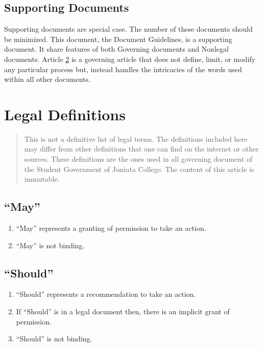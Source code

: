 \documentclass[12pt, letterpaper]{report}
\begin{document}
\begin{linenumbers}
        \section{Supporting Documents}
        Supporting documents are special case. The number of these documents should be minimized. This document, the Document Guidelines, is a supporting document. It share features of both Governing documents and Nonlegal documents. Article \ref{DDG-LegalDef} is a governing article that does not define, limit, or modify any particular process but, instead handles the intricacies of the words used within all other documents. 
	\chapter{Legal Definitions}
	\label{DDG-LegalDef}
    	\begin{quote}
    	    This is not a definitive list of legal terms. The definitions included here may differ from other definitions that one can find on the internet or other sources. These definitions are the ones used in all governing document of the Student Government of Juniata College. The content of this article is immutable. 
    	\end{quote}
    	\section{``May''}
    	    \begin{enumerate}
            \renewcommand{\labelenumi}{\bfseries\alph{enumi})}
                \item ``May'' represents a granting of permission to take an action.
                \item ``May'' is not binding.
            \end{enumerate}
    	\section{``Should''}
    	    \begin{enumerate}
            \renewcommand{\labelenumi}{\bfseries\alph{enumi})}
                \item ``Should'' represents a recommendation to take an action.
                \item If ``Should'' is in a legal document then, there is an implicit grant of permission.
                \item ``Should'' is not binding.
            \end{enumerate}

\end{linenumbers}
\end{document}
